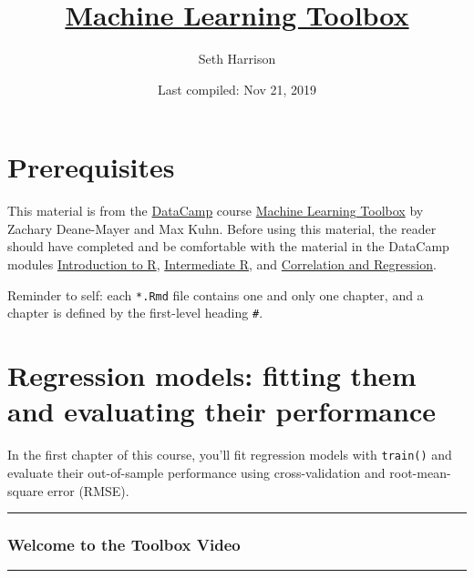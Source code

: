 \documentclass[]{book}
\title{\href{https://www.datacamp.com/courses/machine-learning-toolbox}{Machine
Learning Toolbox}}
\author{Seth Harrison}
\date{Last compiled: Nov 21, 2019}
\begin{document}
\maketitle

{
\setcounter{tocdepth}{1}
\tableofcontents
}
\chapter{Prerequisites}\label{prerequisites}

This material is from the \href{https://www.datacamp.com}{DataCamp}
course
\href{https://www.datacamp.com/courses/machine-learning-toolbox}{Machine
Learning Toolbox} by Zachary Deane-Mayer and Max Kuhn. Before using this
material, the reader should have completed and be comfortable with the
material in the DataCamp modules
\href{https://www.datacamp.com/courses/free-introduction-to-r}{Introduction
to R},
\href{https://www.datacamp.com/courses/intermediate-r}{Intermediate R},
and
\href{https://www.datacamp.com/courses/correlation-and-regression}{Correlation
and Regression}.

Reminder to self: each \texttt{*.Rmd} file contains one and only one
chapter, and a chapter is defined by the first-level heading
\texttt{\#}.

\chapter{Regression models: fitting them and evaluating their
performance}\label{regression-models-fitting-them-and-evaluating-their-performance}

In the first chapter of this course, you'll fit regression models with
\texttt{train()} and evaluate their out-of-sample performance using
cross-validation and root-mean-square error (RMSE).

\begin{center}\rule{0.5\linewidth}{\linethickness}\end{center}

\subsection*{Welcome to the Toolbox
Video}\label{welcome-to-the-toolbox-video}

\begin{center}\rule{0.5\linewidth}{\linethickness}\end{center}
\end{document}
